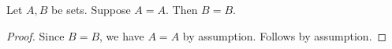 \begin{proposition}\label{since_scope_invalid}
    Let $A,B$ be sets.
    Suppose $A=A$.
    Then $B=B$.
\end{proposition}
\begin{proof}
    Since $B=B$, we have $A=A$ by assumption.
    Follows by assumption.
\end{proof}
